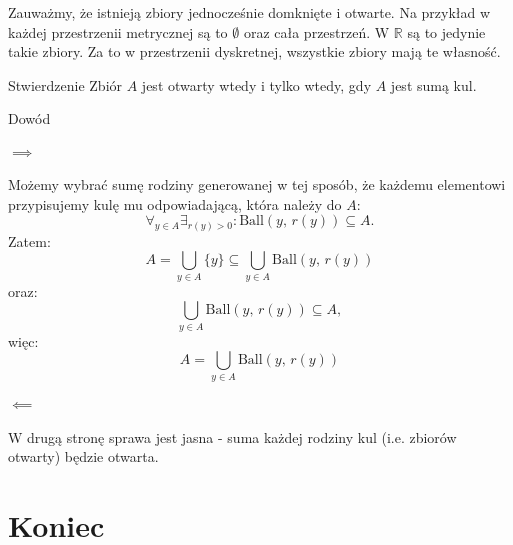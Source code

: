 \documentclass{article}
\newcommand{\R}{\mathbb{R}}
\newcommand{\ball}[2]{\text{Ball}(#1, \, #2)}
\begin{document}
     Zauważmy, że istnieją zbiory jednocześnie domknięte i otwarte. Na przykład w każdej przestrzenii metrycznej są to $\emptyset$ oraz cała przestrzeń. W $\R$ są to jedynie takie zbiory. Za to w przestrzenii dyskretnej, wszystkie zbiory mają te własność.


     \begin{twier}{Stwierdzenie}
        Zbiór $A$ jest otwarty wtedy i tylko wtedy, gdy $A$ jest sumą kul.
     \end{twier}
     \begin{dow}{Dowód} 
        \paragraph{$\implies$} Możemy wybrać sumę rodziny generowanej w tej sposób, że każdemu elementowi przypisujemy kulę mu odpowiadającą, która należy do $A$: \begin{equation}
                \forall_{y \in A} \exists_{r(y) >0}: \ball{y}{r(y)} \subseteq A.
            \end{equation} Zatem: \begin{equation}
                A = \bigcup_{y \in A} \{ y \} \subseteq \bigcup_{y \in A} \ball{y}{r(y)}
            \end{equation} oraz: \begin{equation}
                \bigcup_{y \in A} \ball{y}{r(y)} \subseteq A,
            \end{equation} więc:\begin{equation}
                A = \bigcup_{y \in A} \ball{y}{r(y)}
            \end{equation}
 
        \paragraph{$\impliedby$} W drugą stronę sprawa jest jasna - suma każdej rodziny kul (i.e. zbiorów otwarty) będzie otwarta.
     \end{dow}


\section*{Koniec}
\tableofcontents
\end{document}
